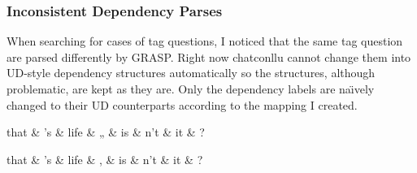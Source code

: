\subsubsection{Inconsistent Dependency Parses}

When searching for cases of tag questions, I noticed that the same tag question are parsed differently by GRASP. Right now chatconllu cannot change them into UD-style dependency structures automatically so the structures, although problematic, are kept as they are. Only the dependency labels are na\"{\i}vely changed to their UD counterparts according to the mapping I created. \\

\begin{minipage}{\widefigurewidth}
\begin{dependency}[edge slant=3pt]
    \begin{deptext}[column sep=1cm]
    that \& 's \& life \& „ \& is \& n't \& it \& ?\\
    \end{deptext}
\end{dependency}
\end{minipage}
\label{fig:taggr}
\vspace*{2cm}
\begin{minipage}{\linewidth}
\begin{dependency}[edge slant=3pt]
    \begin{deptext}[column sep=1cm]
    that \& 's \& life \& , \& is \& n't \& it \& ?\\
    \end{deptext}
\end{dependency}
\end{minipage}
\label{fig:tagdeprel}

